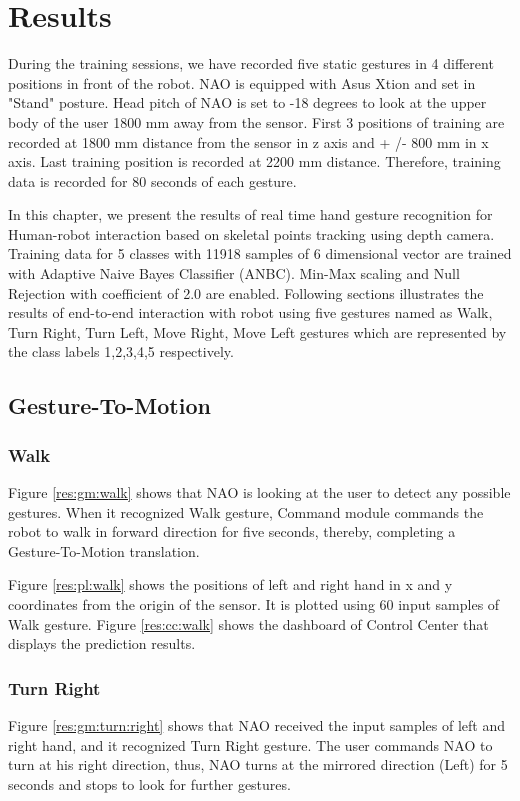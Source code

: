 \chapter{Results} \label{ch:result} During the training sessions, we have recorded five static gestures in 4 different positions in front of the robot. NAO is equipped with Asus Xtion and set in "Stand" posture. Head pitch of NAO is set to -18 degrees to look at the upper body of the user 1800 mm away from the sensor. First 3 positions of training are recorded at 1800 mm distance from the sensor in z axis and + /- 800 mm in x axis. Last training position is recorded at 2200 mm distance. Therefore, training data is recorded for 80 seconds of each gesture.

In this chapter, we present the results of real time hand gesture recognition for Human-robot interaction based on skeletal points tracking using depth camera. Training data for 5 classes with 11918 samples of 6 dimensional vector are trained with Adaptive Naive Bayes Classifier (ANBC). Min-Max scaling and Null Rejection with coefficient of 2.0 are enabled. Following sections illustrates the results of end-to-end interaction with robot using five gestures named as Walk, Turn Right, Turn Left, Move Right, Move Left gestures which are represented by the class labels 1,2,3,4,5 respectively.

\clearpage 
\section{Gesture-To-Motion} 
\subsection{Walk} Figure \ref{res:gm:walk} shows that NAO is looking at the user to detect any possible gestures. When it recognized Walk gesture, Command module commands the robot to walk in forward direction for five seconds, thereby, completing a Gesture-To-Motion translation.



Figure \ref{res:pl:walk} shows the positions of left and right hand in x and y coordinates from the origin of the sensor. It is plotted using 60 input samples of Walk gesture. Figure \ref{res:cc:walk} shows the dashboard of Control Center that displays the prediction results. 

\clearpage 
\subsection{Turn Right} Figure \ref{res:gm:turn:right} shows that NAO received the input samples of left and right hand, and it recognized Turn Right gesture. The user commands NAO to turn at his right direction, thus, NAO turns at the mirrored direction (Left) for 5 seconds and stops to look for further gestures.

